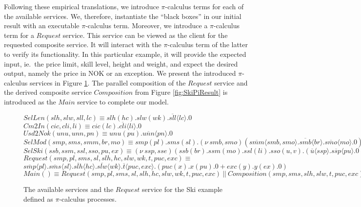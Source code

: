\documentclass[copyright,creativecommons]{eptcs}
\begin{document}
Following these empirical translations, we introduce $\pi$-calculus terms for each of the available services. We, therefore, instantiate the ``black boxes'' in our initial result with an executable $\pi$-calculus term. Moreover, we introduce a $\pi$-calculus term for a $Request$ service. This service can be viewed as the client for the requested composite service. It will interact with the $\pi$-calculus term of the latter to verify its functionality. In this particular example, it will provide the expected input, ie.\ the price limit, skill level, height and weight, and expect the desired output, namely the price in NOK or an exception. We present the introduced $\pi$-calculus services in Figure \ref{fig:AvailServPi}. The parallel composition of the $Request$ service and the derived composite service $Composition$ from Figure \ref{fig:SkiPiResult} is introduced as the $Main$ service to complete our model.

\begin{figure}[htbp]
\centering
\begin{minipage}{.95\linewidth}
\begin{flushleft}
\footnotesize
$SelLen (slh,slw,sll,lc) \equiv slh(hc).slw(wk).\overline{sll}\langle lc \rangle.0$ \\
	\medskip
$Cm2In (cic,cli,li) \equiv cic(lc).\overline{cli}\langle li\rangle .0$ \\
	\medskip
$Usd2Nok (unu,unn,pn) \equiv unu(pu).\overline{unn}\langle pn\rangle .0$ \\
	\medskip
$SelMod (smp,sms,smm,br,mo) \equiv smp(pl).sms(sl).(\nu\ smb,smo)(\overline{smm}\langle smb,smo\rangle .\overline{smb}\langle br\rangle .\overline{smo}\langle mo\rangle .0)$ \\
	\medskip
$SelSki (ssb,ssm,ssl,sso,pu,ex) \equiv (\nu\ ssp,sse)(ssb(br).ssm(mo).ssl(li).sso(u,v).(\overline{u}\langle ssp\rangle .\overline{ssp}\langle pu\rangle .0 + \overline{v}\langle sse\rangle .\overline{sse}\langle ex\rangle .0))$ \\
	\medskip
$Request(smp,pl,sms,sl,slh,hc,slw,wk,t,puc,exc) \equiv$ \\
\hspace*{1cm}  $\overline{smp}\langle pl\rangle .\overline{sms}\langle sl\rangle .\overline{slh}\langle hc\rangle .\overline{slw}\langle wk\rangle .\overline{t}\langle puc,exc\rangle .(puc(x).x(pu).0 + exc(y).y(ex).0)$ \\
	\medskip
$Main () \equiv Request(smp,pl,sms,sl,slh,hc,slw,wk,t,puc,exc)\ ||\ Composition(smp,sms,slh,slw,t,puc,exc)$
		\end{flushleft}
		\end{minipage}
		\normalsize
	\caption{The available services and the $Request$ service for the Ski example defined as $\pi$-calculus processes.}
	\label{fig:AvailServPi}
\end{figure}
\end{document}
